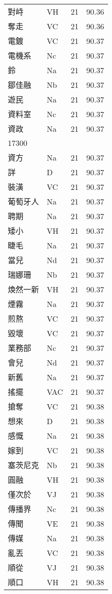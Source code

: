 \documentclass[twocolumn]{book}
\begin{document}
\begin{supertabular}{llrr}
對峙 & VH & 21 &  90.36\\
奪走 & VC & 21 &  90.36\\
電鍍 & VC & 21 &  90.37\\
電機系 & Nc & 21 &  90.37\\
鈴 & Na & 21 &  90.37\\
鄒佳融 & Nb & 21 &  90.37\\
遊民 & Na & 21 &  90.37\\
資料室 & Nc & 21 &  90.37\\
資政 & Na & 21 &  90.37\\
17300\\
資方 & Na & 21 &  90.37\\
詳 & D & 21 &  90.37\\
裝潢 & VC & 21 &  90.37\\
葡萄牙人 & Na & 21 &  90.37\\
聘期 & Na & 21 &  90.37\\
矮小 & VH & 21 &  90.37\\
睫毛 & Na & 21 &  90.37\\
當兒 & Nd & 21 &  90.37\\
瑞娜珊 & Nb & 21 &  90.37\\
煥然一新 & VH & 21 &  90.37\\
煙霧 & Na & 21 &  90.37\\
煎熬 & VC & 21 &  90.37\\
毀壞 & VC & 21 &  90.37\\
業務部 & Nc & 21 &  90.37\\
會兒 & Nd & 21 &  90.37\\
新舊 & Na & 21 &  90.37\\
搖擺 & VAC & 21 &  90.37\\
搶奪 & VC & 21 &  90.38\\
想來 & D & 21 &  90.38\\
感慨 & Na & 21 &  90.38\\
嫁到 & VC & 21 &  90.38\\
塞茨尼克 & Nb & 21 &  90.38\\
圓融 & VH & 21 &  90.38\\
僅次於 & VJ & 21 &  90.38\\
傳播界 & Nc & 21 &  90.38\\
傳聞 & VE & 21 &  90.38\\
傳媒 & Na & 21 &  90.38\\
亂丟 & VC & 21 &  90.38\\
順從 & VJ & 21 &  90.38\\
順口 & VH & 21 &  90.38\\

\end{supertabular}
\end{document}
